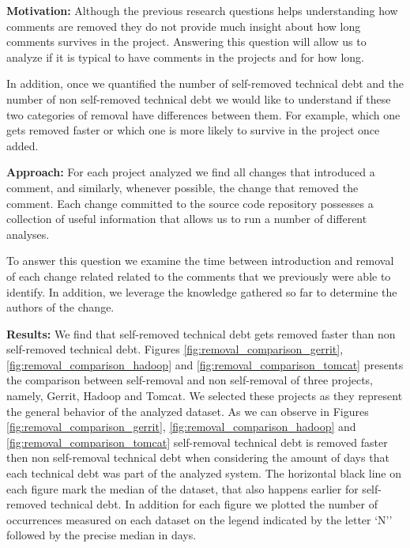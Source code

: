 
\vspace{3mm}
\noindent\rqiii
\vspace{3mm}

\noindent \textbf{Motivation:} Although the previous research questions helps understanding how \SATD comments are removed they do not provide much insight about how long \SATD comments survives in the project. Answering this question will allow us to analyze if it is typical to have \SATD comments in the projects and for how long.  

In addition, once we quantified the number of self-removed technical debt and the number of non self-removed technical debt we would like to understand if these two categories of removal have differences between them. For example, which one gets removed faster or which one is more likely to survive in the project once added. 

\vspace{1mm}
\noindent \textbf{Approach:} For each project analyzed we find all changes that introduced a \SATD comment, and similarly, whenever possible, the change that removed the \SATD comment. Each change committed to the source code repository possesses a collection of useful information  that allows us to run a number of different analyses. 

To answer this question we examine the time between introduction and removal of each change related related to the \SATD comments that we previously were able to identify. In addition, we leverage the knowledge gathered so far to determine the authors of the change. 

\vspace{1mm}
\noindent \textbf{Results:} We find that self-removed technical debt gets removed faster than non self-removed technical debt. Figures \ref{fig:removal_comparison_gerrit}, \ref{fig:removal_comparison_hadoop} and \ref{fig:removal_comparison_tomcat} presents the comparison between self-removal and non self-removal of three projects, namely, Gerrit, Hadoop and Tomcat. We selected these projects as they represent the general behavior of the analyzed dataset. As we can observe in Figures \ref{fig:removal_comparison_gerrit}, \ref{fig:removal_comparison_hadoop} and \ref{fig:removal_comparison_tomcat} self-removal technical debt is removed faster then non self-removal technical debt when considering the amount of days that each technical debt was part of the analyzed system. The horizontal black line on each figure mark the median of the dataset, that also happens earlier for self-removed technical debt. In addition for each figure we plotted the number of occurrences measured on each dataset on the legend indicated by the letter `N'' followed by the precise median in days.

